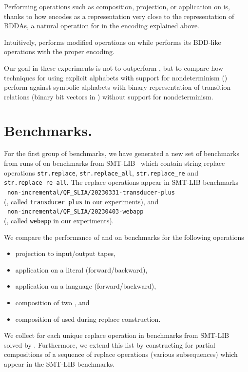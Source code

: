 Performing operations such as composition, projection, or application on \nfts is, thanks to how \mata encodes \nfts as a representation very close to the representation of BDDAs, a natural operation for \mona in the encoding explained above.

Intuitively, \mata performs modified \nfa operations on \nfts while \mona performs its BDD-like operations with the proper encoding.

Our goal in these experiments is not to outperform \mona, but to compare how techniques for \nfts using explicit alphabets with support for nondeterminism (\mata) perform against symbolic alphabets with binary representation of transition relations (binary bit vectors in \mona) without support for nondeterminism.

\section{Benchmarks.}

For the first group of benchmarks, we have generated a new set of benchmarks from runs of \noodler on benchmarks from SMT-LIB~\cite{SMTLIB} which contain string replace operations \texttt{str.replace}, \texttt{str.replace\_all}, \texttt{str.replace\_re} and \texttt{str.replace\_re\_all}.
The replace operations appear in SMT-LIB benchmarks
\\\texttt{
non-incremental/QF\_SLIA/20230331-transducer-plus}\\(\transducerPlus, called \texttt{transducer plus} in our experiments), and\\\texttt{
non-incremental/QF\_SLIA/20230403-webapp}\\(\webapp, called \texttt{webapp} in our experiments).

We compare the performance of \mata and \mona on benchmarks for the following operations
\begin{itemize}
  \item projection to input/output tapes,
  \item application on a literal (forward/backward),
  \item application on a language (forward/backward),
  \item composition of two \nfts, and
  \item composition of \nfts used during replace \nft construction.
\end{itemize}

We collect \nfts for each unique replace operation in benchmarks from SMT-LIB solved by \noodler.
Furthermore, we extend this list by constructing \nfts for partial compositions of a sequence of replace operations (various subsequences) which appear in the SMT-LIB benchmarks.

